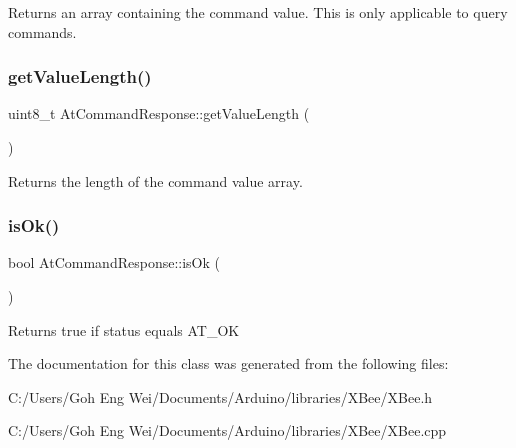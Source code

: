 Returns an array containing the command value. This is only applicable to query commands. \hypertarget{class_at_command_response_ad7d6159fa1777144e94a9ccfeaf83662}{}\label{class_at_command_response_ad7d6159fa1777144e94a9ccfeaf83662} 
\subsubsection{\texorpdfstring{get\+Value\+Length()}{getValueLength()}}
{\footnotesize\ttfamily uint8\+\_\+t At\+Command\+Response\+::get\+Value\+Length (\begin{DoxyParamCaption}{ }\end{DoxyParamCaption})}

Returns the length of the command value array. \hypertarget{class_at_command_response_ab606b3dc93f809b828b54e98a79711d8}{}\label{class_at_command_response_ab606b3dc93f809b828b54e98a79711d8} 
\subsubsection{\texorpdfstring{is\+Ok()}{isOk()}}
{\footnotesize\ttfamily bool At\+Command\+Response\+::is\+Ok (\begin{DoxyParamCaption}{ }\end{DoxyParamCaption})}

Returns true if status equals A\+T\+\_\+\+OK 

The documentation for this class was generated from the following files\+:\begin{DoxyCompactItemize}
\item 
C\+:/\+Users/\+Goh Eng Wei/\+Documents/\+Arduino/libraries/\+X\+Bee/X\+Bee.\+h\item 
C\+:/\+Users/\+Goh Eng Wei/\+Documents/\+Arduino/libraries/\+X\+Bee/X\+Bee.\+cpp\end{DoxyCompactItemize}
